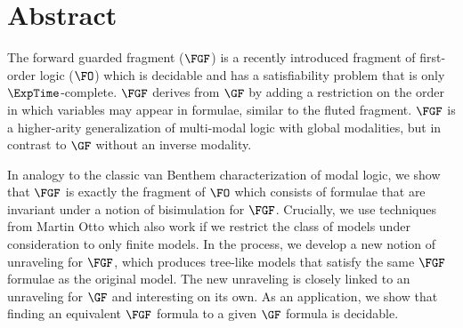 \chapter*{Abstract}

\begingroup
\narrower
\narrower
The forward guarded fragment ($\FGF$) is a recently introduced fragment of first-order logic ($\FO$) which is decidable and has a satisfiability problem that is only $\ExpTime$-complete.
$\FGF$ derives from $\GF$ by adding a restriction on the order in which variables may appear in formulae, similar to the fluted fragment.
$\FGF$ is a higher-arity generalization of multi-modal logic with global modalities, but in contrast to $\GF$ without an inverse modality.

In analogy to the classic van Benthem characterization of modal logic, we show that $\FGF$ is exactly the fragment of $\FO$ which consists of formulae that are invariant under a notion of bisimulation for $\FGF$.
Crucially, we use techniques from Martin Otto which also work if we restrict the class of models under consideration to only finite models.
In the process, we develop a new notion of unraveling for $\FGF$, which produces tree-like models that satisfy the same $\FGF$ formulae as the original model.
The new unraveling is closely linked to an unraveling for $\GF$ and interesting on its own.
As an application, we show that finding an equivalent $\FGF$ formula to a given $\GF$ formula is decidable.

\endgroup
